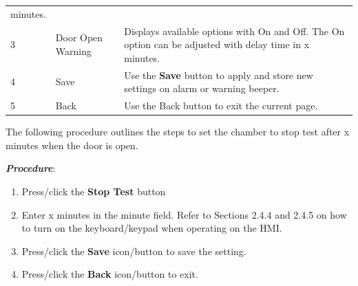 \begin{longtable}[]{@{}|l|l|l|@{}}
\begin{minipage}[t]{0.65\columnwidth}
minutes.\strut
\end{minipage}\tabularnewline
\begin{minipage}[t]{0.04\columnwidth}\raggedright
3\strut
\end{minipage} & \begin{minipage}[t]{0.23\columnwidth}\raggedright
Door Open Warning\strut
\end{minipage} & \begin{minipage}[t]{0.65\columnwidth}\raggedright
Displays available options with On and Off. The On option can be
adjusted with delay time in x minutes.\strut
\end{minipage}\tabularnewline
\begin{minipage}[t]{0.04\columnwidth}\raggedright
4\strut
\end{minipage} & \begin{minipage}[t]{0.23\columnwidth}\raggedright
Save\strut
\end{minipage} & \begin{minipage}[t]{0.65\columnwidth}\raggedright
Use the \textbf{Save} button to apply and store new settings on alarm or
warning beeper.\strut
\end{minipage}\tabularnewline
\begin{minipage}[t]{0.04\columnwidth}\raggedright
5\strut
\end{minipage} & \begin{minipage}[t]{0.23\columnwidth}\raggedright
Back\strut
\end{minipage} & \begin{minipage}[t]{0.65\columnwidth}\raggedright
Use the Back button to exit the current page.\strut
\end{minipage}\tabularnewline
\bottomrule
\end{longtable}

The following procedure outlines the steps to set the chamber to stop
test after x minutes when the door is open.

\textbf{\emph{Procedure}}:

\begin{enumerate}
\def\labelenumi{\arabic{enumi}.}
\tightlist
\item
  Press/click the \textbf{Stop Test} button
\item
  Enter x minutes in the minute field. Refer to Sections 2.4.4 and 2.4.5
  on how to turn on the keyboard/keypad when operating on the HMI.\\
\item
  Press/click the \textbf{Save} icon/button to save the setting.
\item
  Press/click the \textbf{Back} icon/button to exit.
\end{enumerate}


